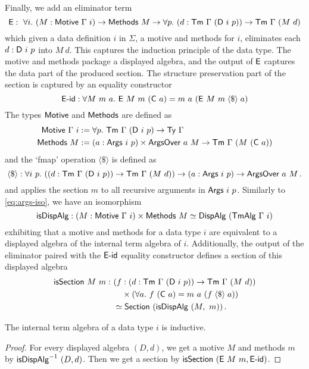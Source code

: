 Finally, we add an eliminator term
\[
\mta{E} :\ \forall i.\ (M : \mta{Motive}\ \Gamma\ i) \to \mta{Methods}\ M \to \forall p.\ (d : \Tm\ \Gamma\ (\mta{D}\ i\ p)) \to \Tm\ \Gamma\ (M\ d) \\
\]
which given a data definition $i$ in $\Sigma$, a motive and methods for $i$,
eliminates each $d : \textsf{D}\ i\ p$ into $M\ d$. This captures the induction
principle of the data type. The motive and methods package a displayed algebra,
and the output of $\textsf{E}$ captures the data part of the produced section. The
structure preservation part of the section is captured by an equality
constructor
\[
\mta{E-id} : \forall M\ m\ a.\ \mta{E}\ M\ m\ (\mta{C}\ a) = m\ a\ (\mta{E}\ M\ m \fmap a)
\]
The types $\textsf{Motive}$ and $\textsf{Methods}$ are defined as
\begin{align*}
  \mta{Motive}\ \Gamma\ i &:= \forall p.\ \Tm\ \Gamma\ (\mta{D}\ i\ p) \to \Ty\ \Gamma \\
  \mta{Methods}\ M &:= (a : \mta{Args}\ i\ p) \times \mta{ArgsOver}\ a\ M \to  \Tm\ \Gamma\ (M\ (\mta{C}\ a))
\end{align*}
and the `fmap' operation $\langle\$\rangle$ is defined as
\[
  \langle\$\rangle : \forall i\ p.\ ((d : \Tm\ \Gamma\ (\mta{D}\ i\ p)) \to \Tm\ \Gamma\ (M\ d)) \to (a : \mta{Args}\ i\ p) \to \mta{ArgsOver}\ a\ M \,.
\]
and applies the section $m$ to all recursive arguments in $\mta{Args}\ i\ p$.
Similarly to \eqref{eq:args-iso}, we have an isomorphism
\begin{equation}
  \mta{isDispAlg} : (M : \mta{Motive}\ \Gamma\ i) \times \mta{Methods}\ M \simeq \mta{DispAlg}\ (\mta{TmAlg}\ \Gamma\ i)
\end{equation}
exhibiting that a motive and methods for a data type $i$ are equivalent to a
displayed algebra of the internal term algebra of $i$.
Additionally, the output of the eliminator paired with the $\textsf{E-id}$ equality
constructor defines a section of this displayed algebra
\begin{align*}
  \textsf{isSection}\ M\ m :\ &(f : (d : \textsf{Tm}\ \Gamma\ (\textsf{D}\ i\ p)) \to \textsf{Tm}\ \Gamma\ (M\ d)) \\ 
    &\quad\times (\forall a.\ f\ (\textsf{C}\ a) = m\ a\ (f \;\langle\$\rangle\; a)) \\
    &\simeq \textsf{Section}\ (\textsf{isDispAlg}\ (M,\ m)) \,.
\end{align*}

\begin{lemma}
The internal term algebra of a data type $i$ is inductive.
\begin{proof}
  For every displayed algebra $(D, d)$, we get a motive $M$ and methods $m$ by
  $\textsf{isDispAlg}^{-1}\ (D, d)$. Then we get a section by $\mta{isSection}\ (\mta{E}\ M\ m, \mta{E-id})$.
\end{proof}
\end{lemma}


